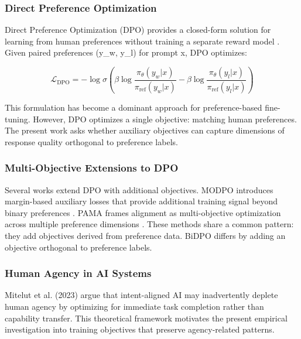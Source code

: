 
\subsubsection{Direct Preference Optimization}

Direct Preference Optimization (DPO) provides a closed-form solution for learning from human preferences without training a separate reward model \citep{rafailov2023direct}. Given paired preferences (y\_w, y\_l) for prompt x, DPO optimizes:

$$\mathcal{L}_{\text{DPO}} = -\log \sigma\left(\beta \log \frac{\pi_\theta(y_w|x)}{\pi_{\text{ref}}(y_w|x)} - \beta \log \frac{\pi_\theta(y_l|x)}{\pi_{\text{ref}}(y_l|x)}\right)$$

This formulation has become a dominant approach for preference-based fine-tuning. However, DPO optimizes a single objective: matching human preferences. The present work asks whether auxiliary objectives can capture dimensions of response quality orthogonal to preference labels.

\subsubsection{Multi-Objective Extensions to DPO}

Several works extend DPO with additional objectives. MODPO introduces margin-based auxiliary losses that provide additional training signal beyond binary preferences \citep{zhou2024modpo}. PAMA frames alignment as multi-objective optimization across multiple preference dimensions \citep{he2025pama}. These methods share a common pattern: they add objectives derived from preference data. BiDPO differs by adding an objective orthogonal to preference labels.

\subsubsection{Human Agency in AI Systems}

Mitelut et al. (2023) argue that intent-aligned AI may inadvertently deplete human agency by optimizing for immediate task completion rather than capability transfer. This theoretical framework motivates the present empirical investigation into training objectives that preserve agency-related patterns.

